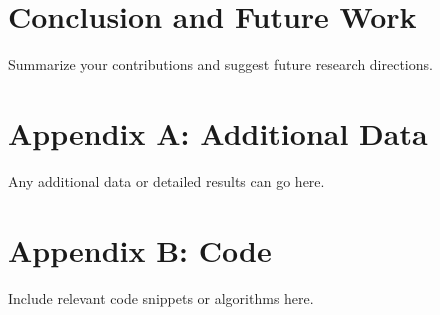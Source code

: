 \documentclass[12pt]{report}
\begin{document}
\chapter{Conclusion and Future Work}
Summarize your contributions and suggest future research directions.




\appendix
\chapter{Appendix A: Additional Data}
Any additional data or detailed results can go here.

\chapter{Appendix B: Code}
Include relevant code snippets or algorithms here.
\end{document}
